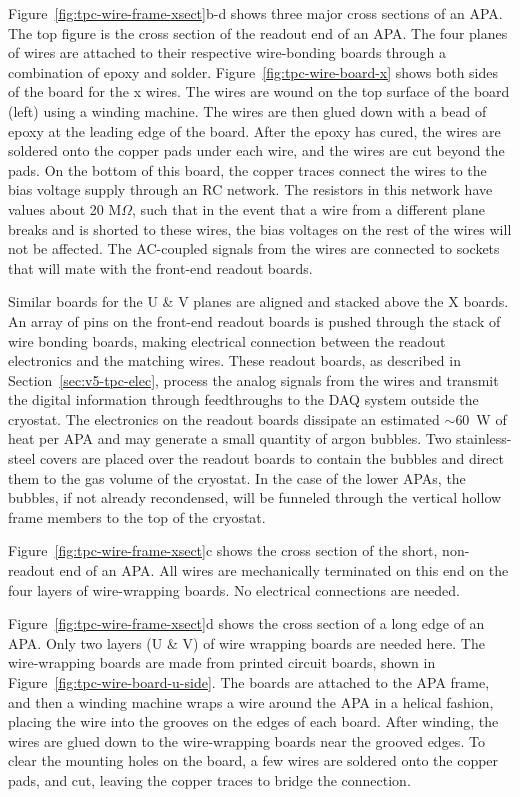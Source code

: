 Figure~\ref{fig:tpc-wire-frame-xsect}b-d shows three major cross sections of an APA.  The top figure is the cross section of the readout end of an 
APA.  The four planes of wires are attached to their respective 
wire-bonding boards through a combination of epoxy and solder.
Figure~\ref{fig:tpc-wire-board-x} shows both sides of the board for the x wires.  
The wires are wound on the top surface of the board (left) using a winding machine.  The wires are then glued down with a bead of epoxy at the leading edge of the board.  After the epoxy has cured, the wires are soldered onto the copper pads under each wire, and the wires are cut beyond the pads.  On the bottom of this board, the copper traces connect the wires to the bias voltage supply through an RC network.  The resistors in this network have values about 20 M$\Omega$, such that in the event that a wire from a different plane breaks and is shorted to these wires, the bias voltages on the rest of the wires will not be affected. The AC-coupled signals from the wires are connected to sockets that will mate with the front-end readout boards.

Similar boards for the U \& V planes are aligned and stacked above the X boards.   An array of pins on the front-end readout boards is pushed through the stack of wire bonding boards, making electrical connection between the readout electronics and the matching wires. These readout boards, as described 
in Section~\ref{sec:v5-tpc-elec}, process the analog signals from the wires and transmit 
the digital information through feedthroughs to the DAQ system outside 
the cryostat.  The electronics on the readout boards dissipate an estimated $\sim$60~W of heat per APA and may generate a small quantity of argon bubbles.
Two stainless-steel covers are placed over the readout boards to contain 
the bubbles and direct them to the gas volume of the cryostat. In the case of the lower APAs, the bubbles, if not already recondensed, will be funneled through the vertical hollow frame members to the top of the cryostat.

Figure~\ref{fig:tpc-wire-frame-xsect}c shows the cross section of the short, non-readout end 
of an APA. All wires are mechanically terminated on this end on the four layers 
of wire-wrapping boards.  No electrical connections are needed. 


Figure~\ref{fig:tpc-wire-frame-xsect}d shows the cross section of a long edge of an APA. 
Only two layers (U \& V) of wire wrapping boards are needed here. The wire-wrapping boards are 
made from printed circuit boards, shown in Figure~\ref{fig:tpc-wire-board-u-side}. The boards are attached to the APA frame, and then a winding machine wraps a wire around the APA in a helical fashion, placing the wire into the grooves on the edges of each board. After winding, the wires are glued down to the wire-wrapping boards near the grooved edges.  To clear the mounting holes on the board, a few wires are soldered onto the copper pads, and cut, leaving the copper traces to bridge the connection.  
 
